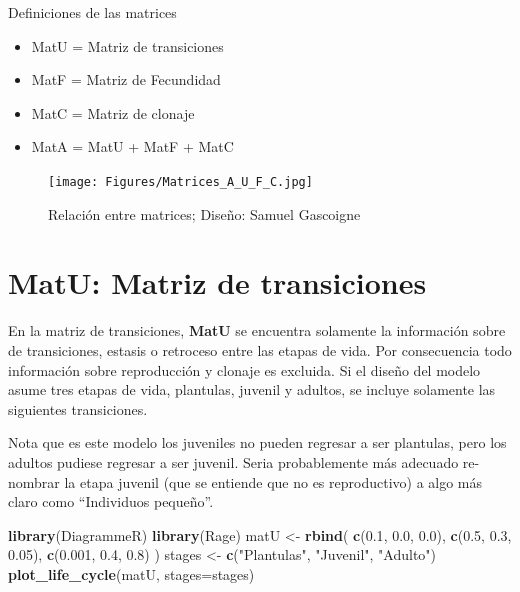 \documentclass[
]{book}
\newenvironment{Shaded}{\begin{snugshade}}{\end{snugshade}}
\newcommand{\AttributeTok}[1]{\textcolor[rgb]{0.13,0.29,0.53}{#1}}
\newcommand{\FloatTok}[1]{\textcolor[rgb]{0.00,0.00,0.81}{#1}}
\newcommand{\FunctionTok}[1]{\textcolor[rgb]{0.13,0.29,0.53}{\textbf{#1}}}
\newcommand{\NormalTok}[1]{#1}
\newcommand{\OtherTok}[1]{\textcolor[rgb]{0.56,0.35,0.01}{#1}}
\newcommand{\StringTok}[1]{\textcolor[rgb]{0.31,0.60,0.02}{#1}}
\providecommand{\tightlist}{%
  \setlength{\itemsep}{0pt}\setlength{\parskip}{0pt}}
\theoremstyle{definition}
\theoremstyle{definition}
\theoremstyle{definition}
\theoremstyle{definition}
\theoremstyle{remark}
\begin{document}
Definiciones de las matrices

\begin{itemize}
\tightlist
\item
  MatU = Matriz de transiciones
\item
  MatF = Matriz de Fecundidad
\item
  MatC = Matriz de clonaje
\item
  MatA = MatU + MatF + MatC
\end{itemize}

\begin{figure}
\centering
\texttt{[image: Figures/Matrices\_A\_U\_F\_C.jpg]}
\caption{Relación entre matrices; Diseño: Samuel Gascoigne}
\end{figure}

\section{MatU: Matriz de transiciones}\label{matu-matriz-de-transiciones}

En la matriz de transiciones, \textbf{MatU} se encuentra solamente la información sobre de transiciones, estasis o retroceso entre las etapas de vida. Por consecuencia todo información sobre reproducción y clonaje es excluida. Si el diseño del modelo asume tres etapas de vida, plantulas, juvenil y adultos, se incluye solamente las siguientes transiciones.

Nota que es este modelo los juveniles no pueden regresar a ser plantulas, pero los adultos pudiese regresar a ser juvenil. Seria probablemente más adecuado re-nombrar la etapa juvenil (que se entiende que no es reproductivo) a algo más claro como ``Individuos pequeño''.

\begin{Shaded}
\begin{Highlighting}[]
\FunctionTok{library}\NormalTok{(DiagrammeR)}
\FunctionTok{library}\NormalTok{(Rage)}
\NormalTok{matU }\OtherTok{\textless{}{-}} \FunctionTok{rbind}\NormalTok{(}
  \FunctionTok{c}\NormalTok{(}\FloatTok{0.1}\NormalTok{, }\FloatTok{0.0}\NormalTok{, }\FloatTok{0.0}\NormalTok{),}
  \FunctionTok{c}\NormalTok{(}\FloatTok{0.5}\NormalTok{, }\FloatTok{0.3}\NormalTok{, }\FloatTok{0.05}\NormalTok{),}
  \FunctionTok{c}\NormalTok{(}\FloatTok{0.001}\NormalTok{, }\FloatTok{0.4}\NormalTok{, }\FloatTok{0.8}\NormalTok{)}
\NormalTok{)}
\NormalTok{stages }\OtherTok{\textless{}{-}} \FunctionTok{c}\NormalTok{(}\StringTok{"Plantulas"}\NormalTok{, }\StringTok{"Juvenil"}\NormalTok{, }\StringTok{"Adulto"}\NormalTok{)}
\FunctionTok{plot\_life\_cycle}\NormalTok{(matU, }\AttributeTok{stages=}\NormalTok{stages)}
\end{Highlighting}
\end{Shaded}
\end{document}
